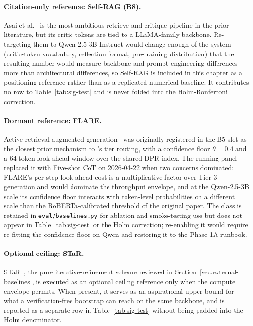 \paragraph{Citation-only reference: Self-RAG (B8).}
Asai et al.~\cite{asai2024selfrag} is the most ambitious retrieve-and-critique pipeline in the prior literature, but its critic tokens are tied to a LLaMA-family backbone. Re-targeting them to Qwen-2.5-3B-Instruct would change enough of the system (critic-token vocabulary, reflection format, pre-training distribution) that the resulting number would measure backbone and prompt-engineering differences more than architectural differences, so Self-RAG is included in this chapter as a positioning reference rather than as a replicated numerical baseline. It contributes no row to Table~\ref{tab:sig-test} and is never folded into the Holm-Bonferroni correction.

\paragraph{Dormant reference: FLARE.}
Active retrieval-augmented generation~\cite{jiang-etal-2023-active} was originally registered in the B5 slot as the closest prior mechanism to \caem{}'s tier routing, with a confidence floor $\theta = 0.4$ and a $64$-token look-ahead window over the shared DPR index. The running panel replaced it with Five-shot CoT on 2026-04-22 when two concerns dominated: FLARE's per-step look-ahead cost is a multiplicative factor over Tier-3 generation and would dominate the throughput envelope, and at the Qwen-2.5-3B scale its confidence floor interacts with token-level probabilities on a different scale than the RoBERTa-calibrated threshold of the original paper. The class is retained in \texttt{eval/baselines.py} for ablation and smoke-testing use but does not appear in Table~\ref{tab:sig-test} or the Holm correction; re-enabling it would require re-fitting the confidence floor on Qwen and restoring it to the Phase 1A runbook.

\paragraph{Optional ceiling: STaR.}
STaR~\cite{NEURIPS2022_639a9a17}, the pure iterative-refinement scheme reviewed in Section~\ref{sec:external-baselines}, is executed as an optional ceiling reference only when the compute envelope permits. When present, it serves as an aspirational upper bound for what a verification-free bootstrap can reach on the same backbone, and is reported as a separate row in Table~\ref{tab:sig-test} without being padded into the Holm denominator.

